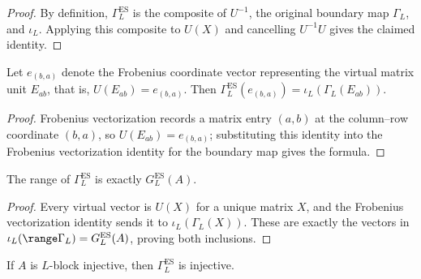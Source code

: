 \begin{proof}
    \leanok
    By definition, $\Gamma_L^{\mathrm{ES}}$ is the composite of $U^{-1}$,
    the original boundary map $\Gamma_L$, and $\iota_L$.  Applying this
    composite to $U(X)$ and cancelling $U^{-1}U$ gives the claimed identity.
\end{proof}

\begin{lemma}
    \label{thm:ground_space_map_es_single}
    \leanok
    Let $e_{(b,a)}$ denote the Frobenius coordinate vector representing the
    virtual matrix unit $E_{ab}$, that is, $U(E_{ab})=e_{(b,a)}$.  Then
    $\Gamma_L^{\mathrm{ES}}(e_{(b,a)})=\iota_L(\Gamma_L(E_{ab}))$.
\end{lemma}

\begin{proof}
    \leanok
    Frobenius vectorization records a matrix entry $(a,b)$ at the
    column--row coordinate $(b,a)$, so $U(E_{ab})=e_{(b,a)}$; substituting
    this identity into the Frobenius vectorization identity for the boundary map
    gives the formula.
\end{proof}

\begin{lemma}
    \label{thm:range_ground_space_map_es}
    \leanok
    The range of $\Gamma_L^{\mathrm{ES}}$ is exactly
    $G_L^{\mathrm{ES}}(A)$.
\end{lemma}

\begin{proof}
    \leanok
    Every virtual vector is $U(X)$ for a unique matrix $X$, and the Frobenius vectorization
    identity sends it to $\iota_L(\Gamma_L(X))$.  These are exactly the
    vectors in $\iota_L(\range\Gamma_L)=G_L^{\mathrm{ES}}(A)$, proving both
    inclusions.
\end{proof}

\begin{lemma}
    \label{thm:ground_space_map_es_injective_block}
    \leanok
    If $A$ is $L$-block injective, then
    $\Gamma_L^{\mathrm{ES}}$ is injective.
\end{lemma}

